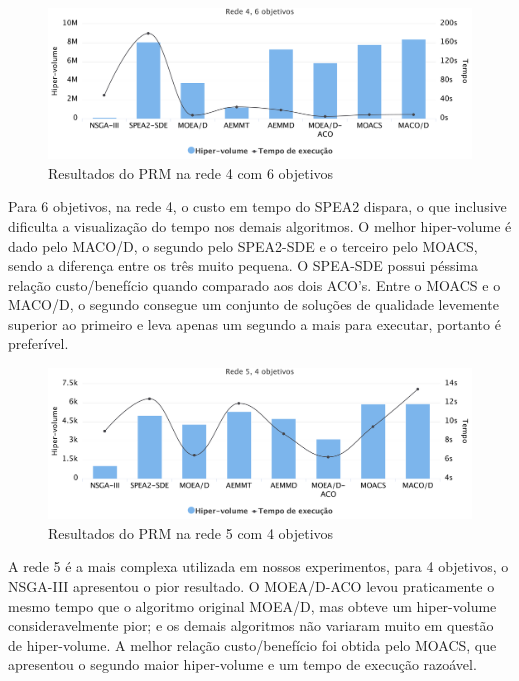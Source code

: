 \begin{figure}[!htbp]
	\caption{Resultados do PRM na rede 4 com 6 objetivos}
	\label{fig_exp4_r4o6}
	\includegraphics[width=1\textwidth]{cap_experimentos/figs/etapa4/r4o6}
\end{figure}

Para 6 objetivos, na rede 4, o custo em tempo do SPEA2 dispara, o que inclusive dificulta a visualização do tempo nos demais algoritmos. O melhor hiper-volume é dado pelo MACO/D, o segundo pelo SPEA2-SDE e o terceiro pelo MOACS, sendo a  diferença entre os três muito pequena. O SPEA-SDE possui péssima relação custo/benefício quando comparado aos dois ACO's. Entre o MOACS e o MACO/D, o segundo consegue um conjunto de soluções de qualidade levemente superior ao primeiro e leva apenas um segundo a mais para executar, portanto é preferível.

\begin{figure}[!htbp]
	\caption{Resultados do PRM na rede 5 com 4 objetivos}
	\label{fig_exp4_r5o4}
	\includegraphics[width=1\textwidth]{cap_experimentos/figs/etapa4/r5o4}
\end{figure}

A rede 5 é a mais complexa utilizada em nossos experimentos, para 4 objetivos, o NSGA-III apresentou o pior resultado. O MOEA/D-ACO levou praticamente o mesmo tempo que o algoritmo original MOEA/D, mas obteve um hiper-volume consideravelmente pior; e os demais algoritmos não variaram muito em questão de hiper-volume. A melhor relação custo/benefício foi obtida pelo MOACS, que apresentou o segundo maior hiper-volume e um tempo de execução razoável.

